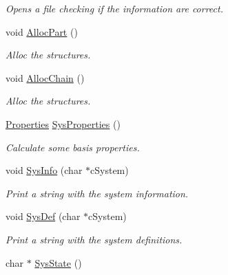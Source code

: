\begin{DoxyCompactItemize}
\begin{DoxyCompactList}\small\item\em Opens a file checking if the information are correct. \end{DoxyCompactList}\item 
void \hyperlink{classVarData_a1a9b1fc0b7f08d25f507becdb57d531e}{Alloc\+Part} ()\hypertarget{classVarData_a1a9b1fc0b7f08d25f507becdb57d531e}{}\label{classVarData_a1a9b1fc0b7f08d25f507becdb57d531e}

\begin{DoxyCompactList}\small\item\em Alloc the structures. \end{DoxyCompactList}\item 
void \hyperlink{classVarData_ab725e5f5e1306bb770cffc9171abbf95}{Alloc\+Chain} ()\hypertarget{classVarData_ab725e5f5e1306bb770cffc9171abbf95}{}\label{classVarData_ab725e5f5e1306bb770cffc9171abbf95}

\begin{DoxyCompactList}\small\item\em Alloc the structures. \end{DoxyCompactList}\item 
\hyperlink{classProperties}{Properties} \hyperlink{classVarData_a5440abb543ae3c83d1b628b0ba0eb3c6}{Sys\+Properties} ()\hypertarget{classVarData_a5440abb543ae3c83d1b628b0ba0eb3c6}{}\label{classVarData_a5440abb543ae3c83d1b628b0ba0eb3c6}

\begin{DoxyCompactList}\small\item\em Calculate some basis properties. \end{DoxyCompactList}\item 
void \hyperlink{classVarData_a4dd85f1789027793b97a591acc9caf30}{Sys\+Info} (char $\ast$c\+System)\hypertarget{classVarData_a4dd85f1789027793b97a591acc9caf30}{}\label{classVarData_a4dd85f1789027793b97a591acc9caf30}

\begin{DoxyCompactList}\small\item\em Print a string with the system information. \end{DoxyCompactList}\item 
void \hyperlink{classVarData_aa415b42b89dfba2ab8189be4e86b41ad}{Sys\+Def} (char $\ast$c\+System)\hypertarget{classVarData_aa415b42b89dfba2ab8189be4e86b41ad}{}\label{classVarData_aa415b42b89dfba2ab8189be4e86b41ad}

\begin{DoxyCompactList}\small\item\em Print a string with the system definitions. \end{DoxyCompactList}\item 
char $\ast$ \hyperlink{classVarData_a497026b20d4baf7d7812310a50a73154}{Sys\+State} ()\hypertarget{classVarData_a497026b20d4baf7d7812310a50a73154}{}\label{classVarData_a497026b20d4baf7d7812310a50a73154}


\end{DoxyCompactItemize}
